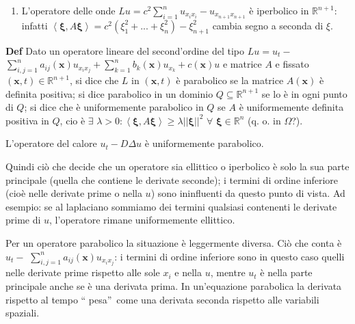 \documentclass{article}
\begin{document}
\begin{enumerate}
\item L'operatore delle onde $Lu=c^{2}%
\sum_{i=1}^{n}u_{x_{i}x_{i}}-u_{x_{n+1}x_{n+1}}$ \`{e} iperbolico in $%
\mathbb{R}
^{n+1}$: infatti $\left\langle \mathbf{\xi },A\mathbf{\xi }\right\rangle
=c^{2}\left( \xi _{1}^{2}+...+\xi _{n}^{2}\right) -\xi _{n+1}^{2}$ cambia
segno a seconda di $\xi $.
\end{enumerate}

\textbf{Def} Dato un operatore lineare del second'ordine del tipo $Lu=u_{t}-$
$\sum_{i,j=1}^{n}a_{ij}\left( \mathbf{x}\right)
u_{x_{i}x_{j}}+\sum_{k=1}^{n}b_{k}\left( \mathbf{x}\right) u_{x_{k}}+c\left( 
\mathbf{x}\right) u$ e matrice $A$ e fissato $\left( \mathbf{x},t\right) \in 
\mathbb{R}
^{n+1}$, si dice che $L$ in $\left( \mathbf{x},t\right) $ \`{e} parabolico
se la matrice $A\left( \mathbf{x}\right) $ \`{e} definita positiva; si dice parabolico in un dominio $Q\subseteq 
\mathbb{R}
^{n+1}$ se lo \`{e} in ogni punto di $Q$; si dice che \`{e} uniformemente
parabolico in $Q$ se $A$ \`{e} uniformemente definita positiva in $Q$, cio%
\`{e} $\exists $ $\lambda >0:\left\langle \mathbf{\xi },A\mathbf{\xi }%
\right\rangle \geq \lambda \left\vert \left\vert \mathbf{\xi }\right\vert
\right\vert ^{2}$ $\forall $ $\mathbf{\xi }\in 
\mathbb{R}
^{n}$ (q. o. in $\Omega $?).

L'operatore del calore $u_{t}-D\Delta u$ \`{e} uniformemente parabolico.

Quindi ci\`{o} che decide che un operatore sia ellittico o iperbolico \`{e}
solo la sua parte principale (quella che contiene le derivate seconde); i
termini di ordine inferiore (cio\`{e} nelle derivate prime o nella $u$) sono
ininfluenti da questo punto di vista. Ad esempio: se al laplaciano sommiamo
dei termini qualsiasi contenenti le derivate prime di $u$, l'operatore
rimane uniformemente ellittico.

Per un operatore parabolico la situazione \`{e} leggermente diversa. Ci\`{o}
che conta \`{e} $u_{t}-$ $\sum_{i,j=1}^{n}a_{ij}\left( \mathbf{x}\right)
u_{x_{i}x_{j}}$: i termini di ordine inferiore sono in questo caso quelli
nelle derivate prime rispetto alle sole $x_{i}$ e nella $u$, mentre $u_{t}$ 
\`{e} nella parte principale anche se \`{e} una derivata prima. In
un'equazione parabolica la derivata rispetto al tempo \textquotedblleft
pesa\textquotedblright\ come una derivata seconda rispetto alle variabili
spaziali.
\end{document}
